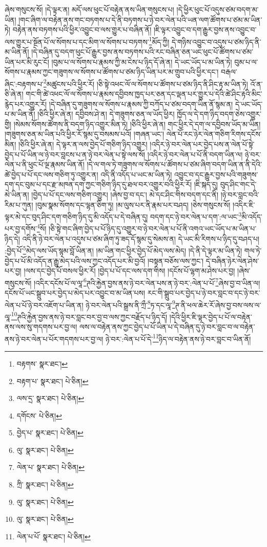 ཞེས་གསུངས་སོ། །དེ་ལྟར་ན། མདོ་ལས་ཕུང་པོ་བརྟེན་ནས་ཡིན་གསུངས་པ། །དེ་ཕྱིར་ཕུང་པོ་འདུས་ཙམ་བདག་མ་ཡིན། །གང་ཞིག་ལ་བརྟེན་ནས་གང་བཏགས་པ་དེ་ནི་བཏགས་པ་ཉེ་བར་ལེན་པའི་ཡན་ལག་ཚོགས་པ་ཙམ་མ་ཡིན་ཏེ། བརྟེན་ནས་བཏགས་པའི་ཕྱིར་འབྱུང་བ་ལས་གྱུར་པ་བཞིན་ནོ། །ཇི་ལྟར་འབྱུང་བ་དག་རྒྱུར་བྱས་ནས་འབྱུང་བ་ལས་གྱུར་པ་སྔོན་པོ་ལ་སོགས་པ་དང་མིག་ལ་སོགས་པ་བཏགས་\footnote{བརྟགས་  སྣར་ཐང་། }མོད་ཀྱི། དེ་གཉིས་འབྱུང་བ་འདུས་པ་ཙམ་ཉིད་ནི་མ་ཡིན་ནོ། །དེ་བཞིན་དུ་བདག་ཕུང་པོ་རྒྱུར་བྱས་ནས་བཏགས་པའི་རང་བཞིན་ཅན་ཡང་ཕུང་པོ་ཚོགས་པ་ཙམ་ཡིན་པར་མི་རུང་ངོ། །བུམ་པ་ལ་སོགས་པ་རྣམས་ཀྱི་མ་ངེས་པ་ཉིད་དོ་ཞེ་ན། དེ་ཡང་ཡོད་པ་མ་ཡིན་ཏེ། བུམ་པ་ལ་སོགས་པ་རྣམས་ཀྱང་གཟུགས་ལ་སོགས་པ་ཚོགས་པ་ཙམ་ཉིད་ཡིན་པར་མ་གྲུབ་པའི་ཕྱིར་དང་། བརྒལ་ཞིང་:བརྟགས་པ་\footnote{བརྟག་པ་  སྣར་ཐང་།  པེ་ཅིན། }མཚུངས་པའི་ཕྱིར་རོ། །ཅི་སྟེ་འཕང་ལོ་ལ་སོགས་པ་ཚོགས་པ་ཙམ་ཉིད་ནི་ཤིང་རྟ་མ་ཡིན་ཏེ། འོ་ན་ཅི་ཞེ་ན། གང་གི་ཚེ་འཕང་ལོ་ལ་སོགས་པ་རྣམས་དབྱིབས་ཁྱད་པར་ཅན་དང་ལྡན་པར་གྱུར་པ་དེའི་ཚེ་ཤིང་རྟའི་མིང་རྙེད་པར་འགྱུར་རོ། །དེ་བཞིན་དུ་གཟུགས་ལ་སོགས་པ་རྣམས་ཀྱི་བཀོད་པ་ཙམ་བདག་ཡིན་ནོ་སྙམ་ན། དེ་ཡང་ཡོད་པ་མ་ཡིན་ནོ། །ཅིའི་ཕྱིར་ཞེ་ན། དབྱིབས་ཤེ་ན། དེ་གཟུགས་ཅན་ལ་ཡོད་ཕྱིར། ཁྱོད་ལ་དེ་དག་ཉིད་བདག་ཅེས་འགྱུར་གྱི། །སེམས་སོགས་ཚོགས་ནི་བདག་ཉིད་འགྱུར་མིན་ཏེ། །ཅིའི་ཕྱིར་ཞེ་ན། གང་ཕྱིར་དེ་དག་ལ་དབྱིབས་ཡོད་མ་ཡིན། །གཟུགས་ཅན་མ་ཡིན་པའི་ཕྱིར་རོ་སྙམ་དུ་བསམས་པའོ། །གཞན་ཡང་། ལེན་པོ་རང་ཉེར་ལེན་གཅིག་རིགས་དངོས་མིན། །ཅིའི་ཕྱིར་ཞེ་ན། དེ་ལྟར་ན་ལས་བྱེད་པོ་གཅིག་ཉིད་འགྱུར། །འདིར་ཉེ་བར་ལེན་པར་བྱེད་པས་ན་ལེན་པོ་སྟེ་བྱེད་པ་པོ་ཡིན་ལ་ཉེ་བར་བླངས་པ་ན་ཉེ་བར་ལེན་པ་སྟེ་ལས་སོ། །འདིར་ཉེ་བར་ལེན་པ་པོ་ནི་བདག་ཡིན་ལ། ཉེ་བར་ལེན་པ་ནི་ཕུང་པོ་ལྔ་རྣམས་ཡིན་ནོ། །དེ་ལ་གལ་ཏེ་གཟུགས་ལ་སོགས་པ་ཚོགས་པ་ཙམ་ཞིག་བདག་ཡིན་ན་ནི་དེའི་ཚེ་བྱེད་པ་པོ་དང་ལས་གཅིག་ཏུ་འགྱུར་ན། འདི་ནི་འདོད་པ་ཡང་མ་ཡིན་ཏེ། འབྱུང་བ་དང་རྒྱུར་བྱས་པའི་གཟུགས་དག་དང་བུམ་པ་དང་རྫ་མཁན་དག་ཀྱང་གཅིག་ཉིད་དུ་ཐལ་བར་འགྱུར་བའི་ཕྱིར་རོ། །ཇི་སྐད་དུ། བུད་ཤིང་གང་དེ་མེ་ཡིན་ན། །བྱེད་པ་པོ་དང་ལས་གཅིག་འགྱུར། །ཞེས་བྱ་བ་དང་། མེ་དང་ཤིང་གིས་བདག་དང་ནི། །ཉེ་བར་བླང་བའི་རིམ་པ་ཀུན། །བུམ་སྣམ་སོགས་དང་ལྷན་ཅིག་ཏུ། །མ་ལུས་པར་ནི་རྣམ་པར་བཤད། །ཅེས་གསུངས་སོ། །འདིར་ཇི་ལྟར་མེ་དང་བུད་ཤིང་དག་གཅིག་ཉིད་དུ་མི་འདོད་པ་དེ་བཞིན་དུ། བདག་དང་ཉེ་བར་ལེན་པ་དག་:ལ་ཡང་\footnote{ལས་དྲ་  སྣར་ཐང་།  པེ་ཅིན། }མི་འདོད་པར་བྱ་དགོས་\footnote{དགོངས་  པེ་ཅིན། }སོ། །ཅི་སྟེ་གང་ཞིག་བྱེད་པ་པོ་ཉིད་དུ་འགྱུར་བ་ཉེ་བར་ལེན་པ་པོ་ནི་འགའ་ཡང་ཡོད་པ་མ་ཡིན་པ་ཉིད་དེ། འདི་ནི་ཉེ་བར་ལེན་པ་འདུས་པ་ཙམ་ཞིག་ཏུ་ཟད་དོ་སྙམ་དུ་སེམས་ན། དེ་ཡང་མི་རིགས་པ་ཉིད་དུ་བཤད་པ། :བྱེད་པོ་\footnote{བྱེད་པ་  སྣར་ཐང་།  པེ་ཅིན། }མེད་ལས་ཡོད་སྙམ་བློ་ཡིན་ན། །མ་ཡིན་གང་ཕྱིར་བྱེད་པོ་མེད་ལས་མེད། །དེ་ནི་དེ་ལྟར་མ་ཡིན་ཏེ། གལ་ཏེ་བྱེད་པ་པོ་མི་འདོད་ན་རྒྱུ་མེད་པའི་ལས་ཀྱང་འདོད་པར་མི་བྱའོ། །བསྟན་བཅོས་ལས་ཀྱང་། དེ་བཞིན་ཉེར་ལེན་ཤེས་པར་བྱ། །ལས་དང་བྱེད་པོ་བསལ་ཕྱིར་རོ། །བྱེད་པ་པོ་དང་ལས་དག་གིས། །དངོས་པོ་ལྷག་མ་ཤེས་པར་བྱ། །ཞེས་གསུངས་སོ། །འདིར་དངོས་པོ་ལ་ལཱ་\footnote{ལུ་  སྣར་ཐང་།  པེ་ཅིན། }ཊའི་རྐྱེན་བྱས་ནས་ཉེ་བར་ལེན་པས་ན་ཉེ་བར་:ལེན་པ་པོ་\footnote{ལེན་པ་  སྣར་ཐང་།  པེ་ཅིན། }ཞེས་བྱ་བ་ཡིན་ལ། དངོས་པོ་ཡང་སྒྲུབ་པར་བྱེད་པ་མེད་པར་འབྱུང་བ་མ་ཡིན་པས། རང་གི་སྒྲུབ་པར་བྱེད་པ་ཉེ་བར་བླང་བ་དང་ཉེ་བར་ལེན་པ་པོ་ཉེ་བར་འཇོག་པ་ཡིན་ན། ཉེ་བར་ལེན་པའི་སྒྲས་ནི་ཀྲྀ་\footnote{ཀྲི་  སྣར་ཐང་།  པེ་ཅིན། }ཏ་དང་ལཱ་\footnote{ལུ་  སྣར་ཐང་།  པེ་ཅིན། }ཊ་ནི་ཕལ་ཆེར་རོ་ཞེས་བྱ་བས་ལས་ལ་ལཱ་\footnote{ལུ་  སྣར་ཐང་།  པེ་ཅིན། }ཊའི་རྐྱེན་བྱས་ནས་ཉེ་བར་བླང་བར་བྱ་བ་ལས་ཀྱང་བརྗོད་པ་ཉིད་དོ། །དེའི་ཕྱིར་ཇི་ལྟར་བྱེད་པ་པོ་ལ་བརྟེན་ནས་ལས་སུ་གདགས་པར་བྱ་ལ། ལས་ལ་བརྟེན་ནས་ཀྱང་བྱེད་པ་པོ་ཡིན་པ་དེ་བཞིན་དུ་ཉེ་བར་བླང་བ་ལ་བརྟེན་ནས་ཉེ་བར་ལེན་པ་པོར་གདགས་པར་བྱ་ལ། ཉེ་བར་:ལེན་པ་པོ་དེ་\footnote{ལེན་པ་པོ་  སྣར་ཐང་།  པེ་ཅིན། }ཉིད་ལ་བརྟེན་ནས་ཉེ་བར་བླང་བ་ཡིན་ནོ། 